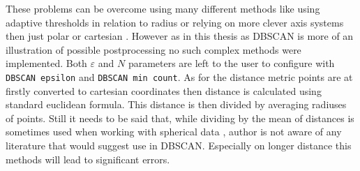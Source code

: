 These problems can be overcome using many different methods like using adaptive thresholds in relation to radius \cite{Kellner2012} or relying on more clever axis systems then just polar or cartesian \cite{Sun2024}.
However as in this thesis as DBSCAN is more of an illustration of possible postprocessing no such complex methods were implemented.
Both $\varepsilon$ and $N$ parameters are left to the user to configure with \texttt{DBSCAN epsilon} and \texttt{DBSCAN min count}.
As for the distance metric points are at firstly converted to cartesian coordinates then distance is calculated using standard euclidean formula.
This distance is then divided by averaging radiuses of points.
Still it needs to be said that, while dividing by the mean of distances is sometimes used when working with spherical data \cite{Fisher1993}, author is not aware of any literature that would suggest use in DBSCAN.
Especially on longer distance this methods will lead to significant errors.

\newpage
\pagestyle{plain}





\listoffigures

\listoftables



\clearpage
\openright

